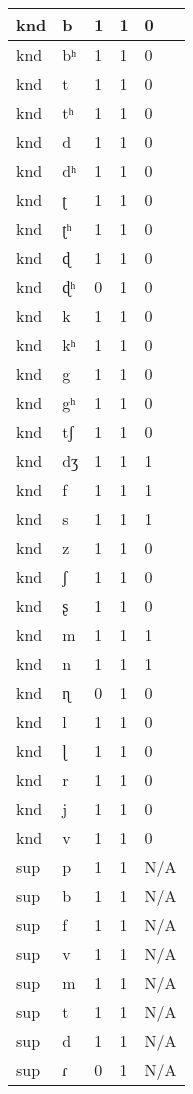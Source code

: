 \begin{longtable}{ | l | l | l | l | l | }
	knd & b & 1 & 1 & 0 \\ \hline
	knd & bʰ & 1 & 1 & 0 \\ \hline
	knd & t & 1 & 1 & 0 \\ \hline
	knd & tʰ & 1 & 1 & 0 \\ \hline
	knd & d & 1 & 1 & 0 \\ \hline
	knd & dʰ & 1 & 1 & 0 \\ \hline
	knd & ʈ & 1 & 1 & 0 \\ \hline
	knd & ʈʰ & 1 & 1 & 0 \\ \hline
	knd & ɖ & 1 & 1 & 0 \\ \hline
	knd & ɖʰ & 0 & 1 & 0 \\ \hline
	knd & k & 1 & 1 & 0 \\ \hline
	knd & kʰ & 1 & 1 & 0 \\ \hline
	knd & g & 1 & 1 & 0 \\ \hline
	knd & gʰ & 1 & 1 & 0 \\ \hline
	knd & tʃ & 1 & 1 & 0 \\ \hline
	knd & dʒ & 1 & 1 & 1 \\ \hline
	knd & f & 1 & 1 & 1 \\ \hline
	knd & s & 1 & 1 & 1 \\ \hline
	knd & z & 1 & 1 & 0 \\ \hline
	knd & ʃ & 1 & 1 & 0 \\ \hline
	knd & ʂ & 1 & 1 & 0 \\ \hline
	knd & m & 1 & 1 & 1 \\ \hline
	knd & n & 1 & 1 & 1 \\ \hline
	knd & ɳ & 0 & 1 & 0 \\ \hline
	knd & l & 1 & 1 & 0 \\ \hline
	knd & ɭ & 1 & 1 & 0 \\ \hline
	knd & r & 1 & 1 & 0 \\ \hline
	knd & j & 1 & 1 & 0 \\ \hline
	knd & v & 1 & 1 & 0 \\ \hline
	sup & p & 1 & 1 & N/A \\ \hline
	sup & b & 1 & 1 & N/A \\ \hline
	sup & f & 1 & 1 & N/A \\ \hline
	sup & v & 1 & 1 & N/A \\ \hline
	sup & m & 1 & 1 & N/A \\ \hline
	sup & t & 1 & 1 & N/A \\ \hline
	sup & d & 1 & 1 & N/A \\ \hline
	sup & ɾ & 0 & 1 & N/A \\ \hline

\end{longtable}

